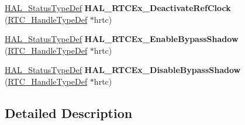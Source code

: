 \begin{DoxyCompactItemize}
\item 
\mbox{\label{group___r_t_c_ex___exported___functions___group3_ga86ca6b8e7b4ea0fede8e1aceef36fdbe}} 
\hyperlink{stm32f4xx__hal__def_8h_a63c0679d1cb8b8c684fbb0632743478f}{H\+A\+L\+\_\+\+Status\+Type\+Def} {\bfseries H\+A\+L\+\_\+\+R\+T\+C\+Ex\+\_\+\+Deactivate\+Ref\+Clock} (\hyperlink{struct_r_t_c___handle_type_def}{R\+T\+C\+\_\+\+Handle\+Type\+Def} $\ast$hrtc)
\item 
\mbox{\label{group___r_t_c_ex___exported___functions___group3_ga77d4058fefb7d89481ca1af3b87a8a32}} 
\hyperlink{stm32f4xx__hal__def_8h_a63c0679d1cb8b8c684fbb0632743478f}{H\+A\+L\+\_\+\+Status\+Type\+Def} {\bfseries H\+A\+L\+\_\+\+R\+T\+C\+Ex\+\_\+\+Enable\+Bypass\+Shadow} (\hyperlink{struct_r_t_c___handle_type_def}{R\+T\+C\+\_\+\+Handle\+Type\+Def} $\ast$hrtc)
\item 
\mbox{\label{group___r_t_c_ex___exported___functions___group3_gaabaf6726dca239445ea362554e0f8ce2}} 
\hyperlink{stm32f4xx__hal__def_8h_a63c0679d1cb8b8c684fbb0632743478f}{H\+A\+L\+\_\+\+Status\+Type\+Def} {\bfseries H\+A\+L\+\_\+\+R\+T\+C\+Ex\+\_\+\+Disable\+Bypass\+Shadow} (\hyperlink{struct_r_t_c___handle_type_def}{R\+T\+C\+\_\+\+Handle\+Type\+Def} $\ast$hrtc)
\end{DoxyCompactItemize}


\subsection{Detailed Description}
